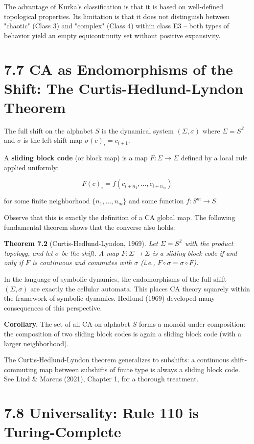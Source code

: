 The advantage of Kurka's classification is that it is based on well-defined topological properties. Its limitation is that it does not distinguish between "chaotic" (Class 3) and "complex" (Class 4) within class E3 -- both types of behavior yield an empty equicontinuity set without positive expansivity.


\section{7.7 CA as Endomorphisms of the Shift: The Curtis-Hedlund-Lyndon Theorem}

The full shift on the alphabet $S$ is the dynamical system $(\Sigma, \sigma)$ where $\Sigma = S^{\mathbb{Z}}$ and $\sigma$ is the left shift map $\sigma(c)_i = c_{i+1}$.

A \textbf{sliding block code} (or block map) is a map $F: \Sigma \to \Sigma$ defined by a local rule applied uniformly:

\[
F(c)_i = f(c_{i+n_1}, \ldots, c_{i+n_m})
\]

for some finite neighborhood $\{ n_1, \ldots, n_m\} $ and some function $f: S^m \to S$.

Observe that this is exactly the definition of a CA global map. The following fundamental theorem shows that the converse also holds:

\textbf{Theorem 7.2} (Curtis-Hedlund-Lyndon, 1969). \textit{Let $\Sigma = S^{\mathbb{Z}}$ with the product topology, and let $\sigma$ be the shift. A map $F: \Sigma \to \Sigma$ is a sliding block code if and only if $F$ is continuous and commutes with $\sigma$ (i.e., $F \circ \sigma = \sigma \circ F$).}

In the language of symbolic dynamics, the endomorphisms of the full shift $(\Sigma, \sigma)$ are exactly the cellular automata. This places CA theory squarely within the framework of symbolic dynamics. Hedlund (1969) developed many consequences of this perspective.

\textbf{Corollary.} The set of all CA on alphabet $S$ forms a monoid under composition: the composition of two sliding block codes is again a sliding block code (with a larger neighborhood).

The Curtis-Hedlund-Lyndon theorem generalizes to subshifts: a continuous shift-commuting map between subshifts of finite type is always a sliding block code. See Lind & Marcus (2021), Chapter 1, for a thorough treatment.


\section{7.8 Universality: Rule 110 is Turing-Complete}

